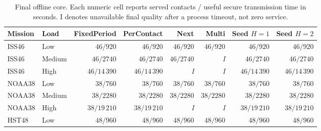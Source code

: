 \documentclass[conference]{IEEEtran}
\newcommand{\missing}{\textit{I}}
\begin{document}
\begin{table}[!t]
    \centering
    \small
    \setlength{\tabcolsep}{4pt}
    \renewcommand{\arraystretch}{1.15}

    \caption{
        Final offline core.
        Each numeric cell reports served contacts /
        useful secure transmission time in seconds.
        I denotes unavailable final quality after a process
        timeout, not zero service.
    }
    \label{tab:core}

    \begin{tabular*}{\textwidth}{
        @{\extracolsep{\fill}}
        llrrrrrr
        @{}
    }
        \toprule

        Mission
        & Load
        & FixedPeriod
        & PerContact
        & Next
        & Multi
        & Seed $H=1$
        & Seed $H=2$ \\

        \midrule

        ISS46
        & Low
        & $46/920$
        & $46/920$
        & $46/920$
        & $46/920$
        & $46/920$
        & $46/920$ \\

        ISS46
        & Medium
        & $46/2740$
        & $46/2740$
        & $46/2740$
        & \missing
        & $46/2740$
        & $46/2740$ \\

        ISS46
        & High
        & $46/14\,390$
        & $46/14\,390$
        & \missing
        & \missing
        & $46/14\,390$
        & $46/14\,390$ \\

        \addlinespace[3pt]

        NOAA38
        & Low
        & $38/760$
        & $38/760$
        & $38/760$
        & $38/760$
        & $38/760$
        & $38/760$ \\

        NOAA38
        & Medium
        & $38/2280$
        & $38/2280$
        & $38/2280$
        & $38/2280$
        & $38/2280$
        & $38/2280$ \\

        NOAA38
        & High
        & $38/19\,210$
        & $38/19\,210$
        & \missing
        & \missing
        & $38/19\,210$
        & $38/19\,210$ \\

        \addlinespace[3pt]

        HST48
        & Low
        & $48/960$
        & $48/960$
        & $48/960$
        & $48/960$
        & $48/960$
        & $48/960$ \\


\end{tabular*}
\end{table}
\end{document}
